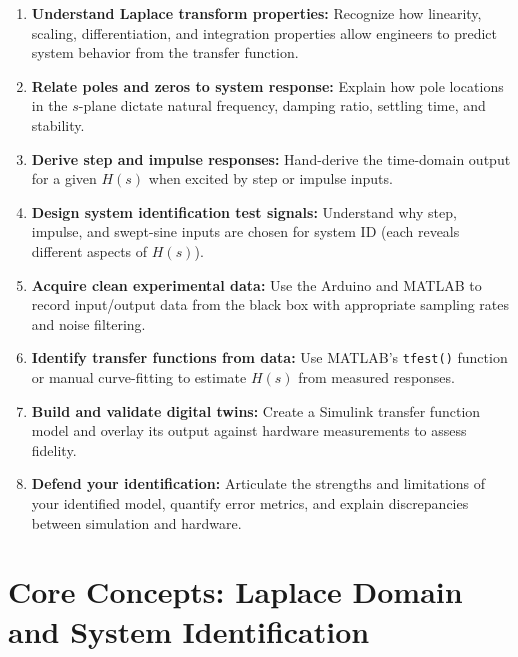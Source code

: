 \documentclass[11pt,letterpaper]{article}
\begin{document}
\begin{enumerate}
    \item \textbf{Understand Laplace transform properties:} Recognize how linearity, scaling, differentiation, and integration properties allow engineers to predict system behavior from the transfer function.

    \item \textbf{Relate poles and zeros to system response:} Explain how pole locations in the $s$-plane dictate natural frequency, damping ratio, settling time, and stability.

    \item \textbf{Derive step and impulse responses:} Hand-derive the time-domain output for a given $H(s)$ when excited by step or impulse inputs.

    \item \textbf{Design system identification test signals:} Understand why step, impulse, and swept-sine inputs are chosen for system ID (each reveals different aspects of $H(s)$).

    \item \textbf{Acquire clean experimental data:} Use the Arduino and MATLAB to record input/output data from the black box with appropriate sampling rates and noise filtering.

    \item \textbf{Identify transfer functions from data:} Use MATLAB's \texttt{tfest()} function or manual curve-fitting to estimate $H(s)$ from measured responses.

    \item \textbf{Build and validate digital twins:} Create a Simulink transfer function model and overlay its output against hardware measurements to assess fidelity.

    \item \textbf{Defend your identification:} Articulate the strengths and limitations of your identified model, quantify error metrics, and explain discrepancies between simulation and hardware.
\end{enumerate}

\clearpage

\section{Core Concepts: Laplace Domain and System Identification}
\end{document}

